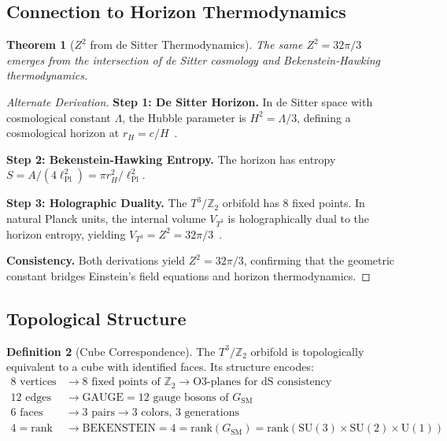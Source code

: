 \documentclass[11pt,a4paper]{article}
\theoremstyle{plain}
\newtheorem{theorem}{Theorem}[section]
\theoremstyle{definition}
\newtheorem{definition}[theorem]{Definition}
\theoremstyle{remark}
\newcommand{\Tthree}{T^3}
\newcommand{\Ztwo}{\mathbb{Z}_2}
\newcommand{\SUthree}{\text{SU}(3)}
\newcommand{\SUtwo}{\text{SU}(2)}
\newcommand{\Uone}{\text{U}(1)}
\newcommand{\GSM}{G_{\text{SM}}}
\begin{document}
\subsection{Connection to Horizon Thermodynamics}

\begin{theorem}[$Z^2$ from de Sitter Thermodynamics]
The same $Z^2 = 32\pi/3$ emerges from the intersection of de Sitter cosmology and Bekenstein-Hawking thermodynamics.
\end{theorem}

\begin{proof}[Alternate Derivation]
\textbf{Step 1: De Sitter Horizon.} In de Sitter space with cosmological constant $\Lambda$, the Hubble parameter is $H^2 = \Lambda/3$, defining a cosmological horizon at $r_H = c/H$~\cite{Bekenstein1973,Hawking1974}.

\textbf{Step 2: Bekenstein-Hawking Entropy.} The horizon has entropy $S = A/(4\ell_{\text{Pl}}^2) = \pi r_H^2/\ell_{\text{Pl}}^2$.

\textbf{Step 3: Holographic Duality.} The $\Tthree/\Ztwo$ orbifold has 8 fixed points. In natural Planck units, the internal volume $V_{\Tthree}$ is holographically dual to the horizon entropy, yielding $V_{\Tthree} = Z^2 = 32\pi/3$~\cite{Maldacena1998}.

\textbf{Consistency.} Both derivations yield $Z^2 = 32\pi/3$, confirming that the geometric constant bridges Einstein's field equations and horizon thermodynamics.
\end{proof}

\subsection{Topological Structure}

\begin{definition}[Cube Correspondence]
The $\Tthree/\Ztwo$ orbifold is topologically equivalent to a cube with identified faces. Its structure encodes:
\begin{align}
8 \text{ vertices} &\rightarrow \text{8 fixed points of } \Ztwo \rightarrow \text{O3-planes for dS consistency} \\
12 \text{ edges} &\rightarrow \text{GAUGE} = 12 \text{ gauge bosons of } \GSM \\
6 \text{ faces} &\rightarrow 3 \text{ pairs} \rightarrow \text{3 colors, 3 generations} \\
4 = \text{rank} &\rightarrow \text{BEKENSTEIN} = 4 = \text{rank}(\GSM) = \text{rank}(\SUthree \times \SUtwo \times \Uone)
\end{align}
\end{definition}
\end{document}
